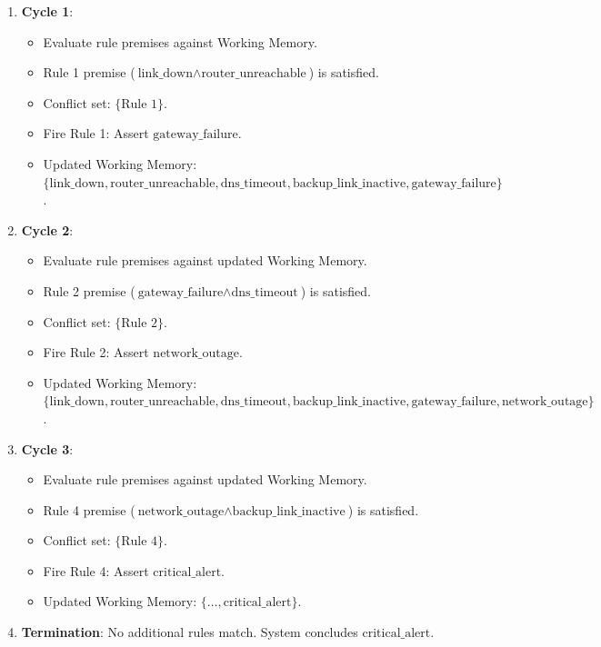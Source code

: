 \documentclass[12pt]{report}
\begin{document}
\begin{enumerate}
    \item \textbf{Cycle 1}:
    \begin{itemize}
        \item Evaluate rule premises against Working Memory.
        \item Rule 1 premise ($\text{link\_down} \land \text{router\_unreachable}$) is satisfied.
        \item Conflict set: $\{\text{Rule 1}\}$.
        \item Fire Rule 1: Assert $\text{gateway\_failure}$.
        \item Updated Working Memory: $\{\text{link\_down}, \text{router\_unreachable}, \text{dns\_timeout}, \text{backup\_link\_inactive}, \text{gateway\_failure}\}$.
    \end{itemize}
    
    \item \textbf{Cycle 2}:
    \begin{itemize}
        \item Evaluate rule premises against updated Working Memory.
        \item Rule 2 premise ($\text{gateway\_failure} \land \text{dns\_timeout}$) is satisfied.
        \item Conflict set: $\{\text{Rule 2}\}$.
        \item Fire Rule 2: Assert $\text{network\_outage}$.
        \item Updated Working Memory: $\{\text{link\_down}, \text{router\_unreachable}, \text{dns\_timeout}, \text{backup\_link\_inactive}, \text{gateway\_failure}, \text{network\_outage}\}$.
    \end{itemize}

    \item \textbf{Cycle 3}:
    \begin{itemize}
        \item Evaluate rule premises against updated Working Memory.
        \item Rule 4 premise ($\text{network\_outage} \land \text{backup\_link\_inactive}$) is satisfied.
        \item Conflict set: $\{\text{Rule 4}\}$.
        \item Fire Rule 4: Assert $\text{critical\_alert}$.
        \item Updated Working Memory: $\{\dots, \text{critical\_alert}\}$.
    \end{itemize}

    \item \textbf{Termination}: No additional rules match. System concludes $\text{critical\_alert}$.
\end{enumerate}
\end{document}
